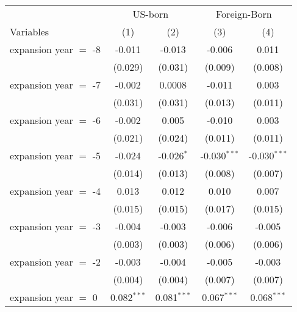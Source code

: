 \documentclass[
]{article}
\let\origtable\table
\let\endorigtable\endtable
\renewenvironment{table}[1][ht]{
      \expandafter\origtable\expandafter[H]
    }{
      \endorigtable
    }
\begin{document}
\begin{table}[htbp]
   \caption{The Impact of Medicaid Expansion on Medicaid Coverage }
   \centering
   \small
   \begin{adjustbox}{width = 0.6\textwidth, center}
      \renewcommand*{\arraystretch}{0.5}
      \begin{tabular}{lcccc}
         \tabularnewline \midrule \midrule
          & \multicolumn{2}{c}{US-born} & \multicolumn{2}{c}{Foreign-Born} \\ \cmidrule(lr){2-3} \cmidrule(lr){4-5}
         Variables             & (1)           & (2)           & (3)            & (4)\\  
         \midrule 
         expansion year $=$ -8 & -0.011        & -0.013        & -0.006         & 0.011\\   
                               & (0.029)       & (0.031)       & (0.009)        & (0.008)\\   
         expansion year $=$ -7 & -0.002        & 0.0008        & -0.011         & 0.003\\   
                               & (0.031)       & (0.031)       & (0.013)        & (0.011)\\   
         expansion year $=$ -6 & -0.002        & 0.005         & -0.010         & 0.003\\   
                               & (0.021)       & (0.024)       & (0.011)        & (0.011)\\   
         expansion year $=$ -5 & -0.024        & -0.026$^{*}$  & -0.030$^{***}$ & -0.030$^{***}$\\   
                               & (0.014)       & (0.013)       & (0.008)        & (0.007)\\   
         expansion year $=$ -4 & 0.013         & 0.012         & 0.010          & 0.007\\   
                               & (0.015)       & (0.015)       & (0.017)        & (0.015)\\   
         expansion year $=$ -3 & -0.004        & -0.003        & -0.006         & -0.005\\   
                               & (0.003)       & (0.003)       & (0.006)        & (0.006)\\   
         expansion year $=$ -2 & -0.003        & -0.004        & -0.005         & -0.003\\   
                               & (0.004)       & (0.004)       & (0.007)        & (0.007)\\   
         expansion year $=$ 0  & 0.082$^{***}$ & 0.081$^{***}$ & 0.067$^{***}$  & 0.068$^{***}$\\   

\end{tabular}
\end{adjustbox}
\end{table}
\end{document}
